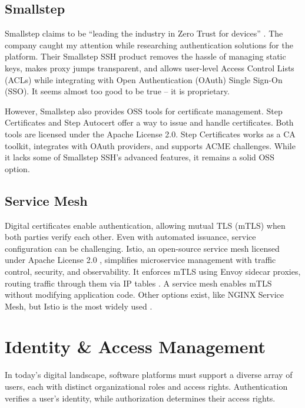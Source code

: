 \subsection{Smallstep}
Smallstep claims to be ``leading the industry in Zero Trust for devices'' \parencite{smallstep}. The company caught my attention while researching authentication solutions for the platform. Their Smallstep SSH product removes the hassle of managing static keys, makes proxy jumps transparent, and allows user-level Access Control Lists (ACLs) while integrating with Open Authentication (OAuth) Single Sign-On (SSO). It seems almost too good to be true -- it is proprietary.

However, Smallstep also provides OSS tools for certificate management. Step Certificates \Parencite{smallstep_certificates} and Step Autocert \Parencite{smallstep_autocert} offer a way to issue and handle certificates. Both tools are licensed under the Apache License 2.0. Step Certificates works as a CA toolkit, integrates with OAuth providers, and supports ACME challenges. While it lacks some of Smallstep SSH's advanced features, it remains a solid OSS option.

\subsection{Service Mesh}
Digital certificates enable authentication, allowing mutual TLS (mTLS) when both parties verify each other. Even with automated issuance, service configuration can be challenging. Istio, an open-source service mesh licensed under Apache License 2.0 \Parencite{istio_license}, simplifies microservice management with traffic control, security, and observability. It enforces mTLS using Envoy sidecar proxies, routing traffic through them via IP tables \Parencite{istio_architecture}. A service mesh enables mTLS without modifying application code. Other options exist, like NGINX Service Mesh, but Istio is the most widely used \Parencite{toptal_service_mesh}.

\section{Identity \& Access Management}\label{chap:IAM}
In today's digital landscape, software platforms must support a diverse array of users, each with distinct organizational roles and access rights. Authentication verifies a user's identity, while authorization determines their access rights.


